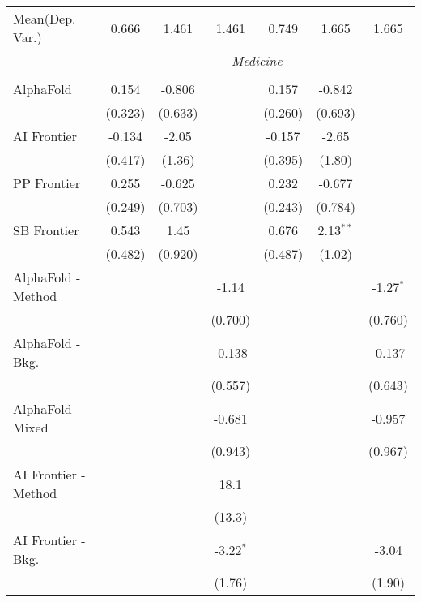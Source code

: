 \begin{tabular}{lcccccc}
Mean(Dep. Var.) & 0.666 & 1.461 & 1.461 & 0.749 & 1.665 & 1.665 \\
 & \multicolumn{6}{c}{\textit{Medicine}} \\ \\
   AlphaFold            & 0.154   & -0.806  &               & 0.157   & -0.842      &   \\   
                        & (0.323) & (0.633) &               & (0.260) & (0.693)     &   \\   
   AI Frontier          & -0.134  & -2.05   &               & -0.157  & -2.65       &   \\   
                        & (0.417) & (1.36)  &               & (0.395) & (1.80)      &   \\   
   PP Frontier          & 0.255   & -0.625  &               & 0.232   & -0.677      &   \\   
                        & (0.249) & (0.703) &               & (0.243) & (0.784)     &   \\   
   SB Frontier          & 0.543   & 1.45    &               & 0.676   & 2.13$^{**}$ &   \\   
                        & (0.482) & (0.920) &               & (0.487) & (1.02)      &   \\   
   AlphaFold - Method   &         &         & -1.14         &         &             & -1.27$^{*}$\\   
                        &         &         & (0.700)       &         &             & (0.760)\\   
   AlphaFold - Bkg.     &         &         & -0.138        &         &             & -0.137\\   
                        &         &         & (0.557)       &         &             & (0.643)\\   
   AlphaFold - Mixed    &         &         & -0.681        &         &             & -0.957\\   
                        &         &         & (0.943)       &         &             & (0.967)\\   
   AI Frontier - Method &         &         & 18.1          &         &             &   \\   
                        &         &         & (13.3)        &         &             &   \\   
   AI Frontier - Bkg.   &         &         & -3.22$^{*}$   &         &             & -3.04\\   
                        &         &         & (1.76)        &         &             & (1.90)\\   

\end{tabular}
